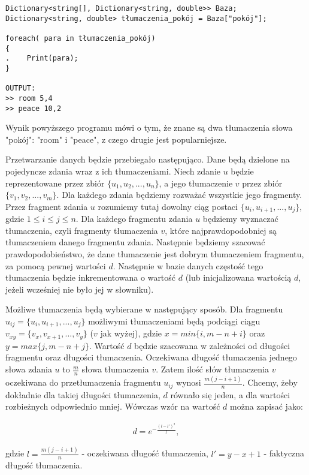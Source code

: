 \documentclass[12pt]{article}
\begin{document}
\begin{verbatim}
Dictionary<string[], Dictionary<string, double>> Baza;
Dictionary<string, double> tłumaczenia_pokój = Baza["pokój"];

foreach( para in tłumaczenia_pokój)
{
.    Print(para);
}

OUTPUT:
>> room 5,4
>> peace 10,2
\end{verbatim}

Wynik powyższego programu mówi o tym, że znane są dwa tłumaczenia słowa "pokój": "room" i "peace", z czego drugie jest popularniejsze.

Przetwarzanie danych będzie przebiegało następująco. Dane będą dzielone na pojedyncze zdania wraz z ich tłumaczeniami.
Niech zdanie $u$ będzie reprezentowane przez zbiór $\{u_1,u_2,...,u_n\}$, a jego tłumaczenie $v$ przez zbiór $\{v_1, v_2, ..., v_m\}$. Dla każdego zdania będziemy rozważać wszystkie jego fragmenty. Przez fragment zdania $u$ rozumiemy tutaj dowolny ciąg postaci $\{u_i, u_{i+1},...,u_{j}\}$, gdzie $ 1 \leq i \leq j \leq n$. Dla każdego fragmentu zdania $u$ będziemy wyznaczać tłumaczenia, czyli fragmenty tłumaczenia $v$, które najprawdopodobniej są tłumaczeniem danego fragmentu zdania. Następnie będziemy szacować prawdopodobieństwo, że dane tłumaczenie jest dobrym tłumaczeniem fragmentu, za pomocą pewnej wartości $d$. Następnie w bazie danych częstość tego tłumaczenia będzie inkrementowana o wartość $d$ (lub inicjalizowana wartością $d$, jeżeli wcześniej nie było jej w słowniku).

Możliwe tłumaczenia będą wybierane w następujący sposób. Dla fragmentu $u_{ij} = \{u_i, u_{i+1},...,u_{j}\}$ możliwymi tłumaczeniami będą podciągi ciągu $v_{xy} = \{v_x, v_{x+1}, ..., v_y\}$ ($v$ jak wyżej), gdzie $x = min\{i, m-n+i\}$ oraz $y = max\{j, m-n+j\}$. Wartość $d$ będzie szacowana w zależności od długości fragmentu oraz długości tłumaczenia. Oczekiwana długość tłumaczenia jednego słowa zdania $u$ to $\frac{m}{n}$ słowa tłumaczenia $v$. Zatem ilość słów tłumaczenia $v$ oczekiwana do przetłumaczenia fragmentu $u_{ij}$ wynosi $\frac{m(j-i+1)}{n}$. Chcemy, żeby dokładnie dla takiej długości tłumaczenia, $d$ równało się jeden, a dla wartości rozbieżnych odpowiednio mniej. Wówczas wzór na wartość $d$ można zapisać jako:

\begin{align*}
    d = e^{-\frac{(l -l')^2}{l}},
\end{align*}

gdzie $l = \frac{m(j-i+1)}{n}$ - oczekiwana długość tłumaczenia, $l' = y-x+1$ - faktyczna długość tłumaczenia.
\end{document}
